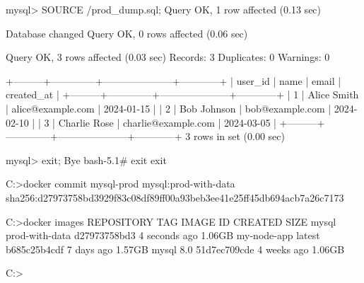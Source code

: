 mysql> SOURCE /prod_dump.sql;
Query OK, 1 row affected (0.13 sec)

Database changed
Query OK, 0 rows affected (0.06 sec)

Query OK, 3 rows affected (0.03 sec)
Records: 3  Duplicates: 0  Warnings: 0

+---------+--------------+---------------------+------------+
| user_id | name         | email               | created_at |
+---------+--------------+---------------------+------------+
|       1 | Alice Smith  | alice@example.com   | 2024-01-15 |
|       2 | Bob Johnson  | bob@example.com     | 2024-02-10 |
|       3 | Charlie Rose | charlie@example.com | 2024-03-05 |
+---------+--------------+---------------------+------------+
3 rows in set (0.00 sec)

mysql> exit;
Bye
bash-5.1# exit
exit

C:\Users\yugalsai>docker commit mysql-prod mysql:prod-with-data
sha256:d27973758bd3929f83c08df89ff00a93beb3ee41e25ff45db694acb7a26c7173

C:\Users\yugalsai>docker images
REPOSITORY    TAG              IMAGE ID       CREATED         SIZE
mysql         prod-with-data   d27973758bd3   4 seconds ago   1.06GB
my-node-app   latest           b685c25b4cdf   7 days ago      1.57GB
mysql         8.0              51d7ec709cde   4 weeks ago     1.06GB

C:\Users\yugalsai>
